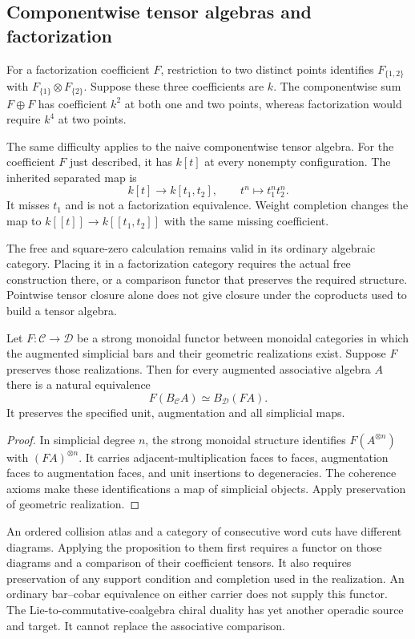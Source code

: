 \subsection{Componentwise tensor algebras and factorization}

For a factorization coefficient $F$, restriction to two distinct
points identifies $F_{\{1,2\}}$ with
$F_{\{1\}}\otimes F_{\{2\}}$.
Suppose these three coefficients are $k$.
The componentwise sum $F\oplus F$ has coefficient $k^2$ at
both one and two points, whereas factorization would require $k^4$
at two points.

The same difficulty applies to the naive componentwise tensor algebra.
For the coefficient $F$ just described, it has $k[t]$ at every
nonempty configuration. The inherited separated map is
\[
 k[t]\longrightarrow k[t_1,t_2],
 \qquad t^n\longmapsto t_1^nt_2^n.
\]
It misses $t_1$ and is not a factorization equivalence.
Weight completion changes the map to
$k[[t]]\to k[[t_1,t_2]]$ with the same missing coefficient.

The free and square-zero calculation remains valid in its ordinary
algebraic category. Placing it in a factorization category requires
the actual free construction there, or a comparison functor that
preserves the required structure.
Pointwise tensor closure alone does not give closure under the
coproducts used to build a tensor algebra.

\begin{proposition}\label{prop:vol2-bar-functor}
Let $F:\mathcal C\to\mathcal D$ be a strong monoidal functor
between monoidal categories in which the augmented simplicial bars
and their geometric realizations exist.
Suppose $F$ preserves those realizations.
Then for every augmented associative algebra $A$ there is a natural
equivalence
\[
 F(B_{\mathcal C}A)\simeq B_{\mathcal D}(F A).
\]
It preserves the specified unit, augmentation and all simplicial maps.
\end{proposition}
\begin{proof}
In simplicial degree $n$, the strong monoidal structure identifies
$F(A^{\otimes n})$ with $(F A)^{\otimes n}$.
It carries adjacent-multiplication faces to faces, augmentation
faces to augmentation faces, and unit insertions to degeneracies.
The coherence axioms make these identifications a map of simplicial
objects. Apply preservation of geometric realization.
\end{proof}

An ordered collision atlas and a category of consecutive word cuts
have different diagrams.
Applying the proposition to them first requires a functor on those
diagrams and a comparison of their coefficient tensors.
It also requires preservation of any support condition and completion
used in the realization.
An ordinary bar--cobar equivalence on either carrier does not supply
this functor.
The Lie-to-commutative-coalgebra chiral duality has yet another operadic
source and target. It cannot replace the associative comparison.

